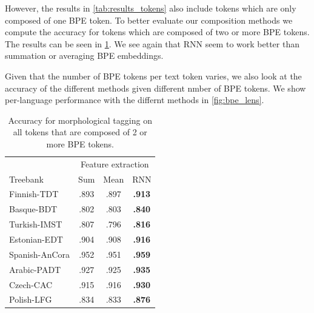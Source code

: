 \documentclass[11pt]{article}
\begin{document}
	However, the results in \cref{tab:results_tokens} also include tokens which are only composed of one BPE token. To better evaluate our composition methods we compute the accuracy for tokens which are composed of two or more BPE tokens. The results can be seen in \cref{tab:results_large_tokens}.
    We see again that RNN seem to work better than summation or averaging BPE embeddings. 

    Given that the number of BPE tokens per text token varies, we also look at the accuracy of the different methods given different nmber of BPE tokens. We show per-language performance with the differnt methods in \cref{fig:bpe_lens}.
    
	\begin{table}[h]
	\centering
	\begin{tabular}{l|ccc}
		 & \multicolumn{3}{c}{Feature extraction} \\
		Treebank & Sum & Mean & RNN \\
		 \hline
		Finnish-TDT & .893 & .897 & \textbf{.913} \\ 
		Basque-BDT  & .802 & .803 & \textbf{.840} \\
		Turkish-IMST & .807 & .796 & \textbf{.816} \\
		Estonian-EDT & .904 & .908 & \textbf{.916} \\
		Spanish-AnCora & .952 & .951 & \textbf{.959} \\
		Arabic-PADT & .927 & .925 & \textbf{.935}\\
		Czech-CAC & .915 & .916 & \textbf{.930} \\
		Polish-LFG & .834 & .833 & \textbf{.876} \\
	\end{tabular}
	\caption{\label{tab:results_large_tokens} Accuracy for morphological tagging on all tokens that are composed of 2 or more BPE tokens.}
\end{table}
\end{document}

